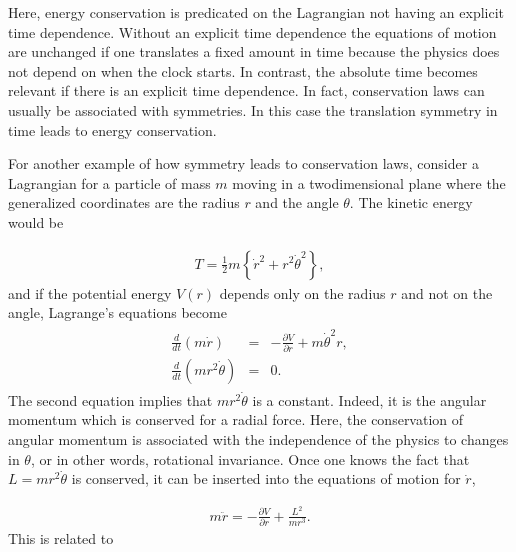 \documentclass[letterpaper,10pt,english]{sphinxmanual}
\begin{document}
Here, energy conservation is predicated on the Lagrangian not having
an explicit time dependence. Without an explicit time dependence the
equations of motion are unchanged if one translates a fixed amount in
time because the physics does not depend on when the clock starts. In
contrast, the absolute time becomes relevant if there is an explicit
time dependence. In fact, conservation laws can usually be associated
with symmetries. In this case the translation symmetry in time leads
to energy conservation.

For another example of how symmetry leads to conservation laws,
consider a Lagrangian for a particle of mass \(m\) moving in a
two\sphinxhyphen{}dimensional plane where the generalized coordinates are the radius
\(r\) and the angle \(\theta\). The kinetic energy would be




\begin{equation*}
\begin{split}
\begin{equation}
T=\frac{1}{2}m\left\{\dot{r}^2+r^2\dot{\theta}^2\right\},
\label{_auto102} \tag{138}
\end{equation}
\end{split}
\end{equation*}
and if the potential energy \(V(r)\) depends only on the radius \(r\) and
not on the angle, Lagrange’s equations become
\begin{equation*}
\begin{split}
\begin{eqnarray}
\frac{d}{dt}(m\dot{r})&=&-\frac{\partial V}{\partial r}+m\dot{\theta}^2r,\\
\nonumber
\frac{d}{dt}(mr^2\dot{\theta})&=&0.
\end{eqnarray}
\end{split}
\end{equation*}
The second equation implies that \(mr^2\dot{\theta}\) is a
constant. Indeed, it is the angular momentum which is conserved for a
radial force. Here, the conservation of angular momentum is associated
with the independence of the physics to changes in \(\theta\), or in
other words, rotational invariance. Once one knows the fact that
\(L=mr^2\dot{\theta}\) is conserved, it can be inserted into the
equations of motion for \(\dot{r}\),




\begin{equation*}
\begin{split}
\begin{equation}
m\ddot{r}=-\frac{\partial V}{\partial r}+\frac{L^2}{mr^3}.
\label{_auto103} \tag{139}
\end{equation}
\end{split}
\end{equation*}
This is related to 
\end{document}
